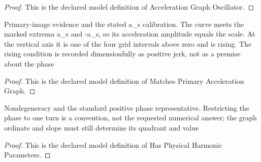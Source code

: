 \begin{proof}
  This is the declared model definition of Acceleration Graph Oscillator.
\end{proof}
\begin{definition}
  \label{def:physics:phyx-mini-0277:phyxminiproblems-problemphyxmini0277-matchesprimaryaccelerationgraph}
  Primary-image evidence and the stated a\_s calibration. The curve meets the marked extrema a\_s and -a\_s, so its acceleration amplitude equals the scale. At the vertical axis it is one of the four grid intervals above zero and is rising. The rising condition is recorded dimensionfully as positive jerk, not as a premise about the phase
\end{definition}
\begin{proof}
  This is the declared model definition of Matches Primary Acceleration Graph.
\end{proof}
\begin{definition}
  \label{def:physics:phyx-mini-0277:phyxminiproblems-problemphyxmini0277-hasphysicalharmonicparameters}
  Nondegeneracy and the standard positive phase representative. Restricting the phase to one turn is a convention, not the requested numerical answer; the graph ordinate and slope must still determine its quadrant and value
\end{definition}
\begin{proof}
  This is the declared model definition of Has Physical Harmonic Parameters.
\end{proof}
